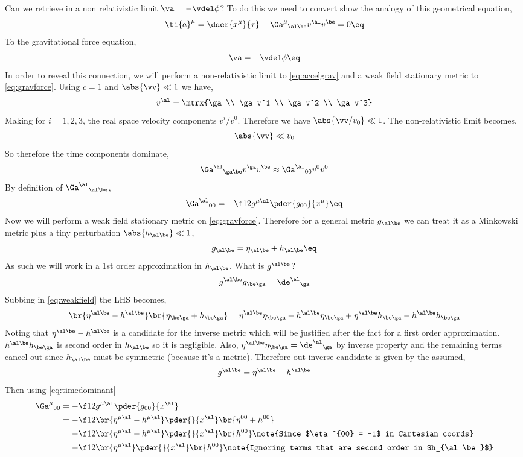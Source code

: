 \documentclass{article}
\begin{document}
Can we retrieve in a non relativistic limit $\va = - \vdel \phi$? To do this we need to convert show the analogy of this geometrical equation,
\[ \ti{a}^\mu = \dder{x^\mu}{\tau} + {\Ga^{\mu}}_{\al\be} v^\al v^\be = 0 \eq \label{eq:accelgrav} \]
To the gravitational force equation,
\[ \va = - \vdel \phi \eq \label{eq:gravforce}\]
In order to reveal this connection, we will perform a non-relativistic limit to \eqref{eq:accelgrav} and a weak field stationary metric to \eqref{eq:gravforce}. Using $c=1$ and $\abs{\vv} \ll 1$ we have,
\[ v^\al = \mtrx{\ga \\ \ga v^1 \\ \ga v^2 \\ \ga v^3} \]
Making for $i = 1,2,3$, the real space velocity components $v^i/v^0$. Therefore we have $\abs{\vv/v_0} \ll 1$. The non-relativistic limit becomes,
\[ \abs{\vv} \ll v_0 \]
So therefore the time components dominate,
\[ {\Ga^\al}_{\ga\be}v^\ga v^\be \approx {\Ga^\al}_{00}v^0 v^0 \]
By definition of ${\Ga^\al}_{\al\be}$,
\[ {\Ga^\al}_{00} = -\f12 g^{\mu\al} \pder{g_{00}}{x^\mu}  \eq \label{eq:timedominant}\]
Now we will perform a weak field stationary metric on \eqref{eq:gravforce}. Therefore for a general metric $g_{\al\be}$ we can treat it as a Minkowski metric plus a tiny perturbation $\abs{h_{\al\be}} \ll 1$,
\[ g_{\al\be} = \eta_{\al\be} + h_{\al\be} \eq \label{eq:weakfield} \]
As such we will work in a 1st order approximation in $h_{\al\be}$. What is $g^{\al\be}$?
\[ g^{\al\be}g_{\be\ga} = {\de^{\al}}_\ga \]
Subbing in \eqref{eq:weakfield} the LHS becomes,
\[ \br{\eta^{\al\be} - h^{\al\be}}\br{\eta_{\be\ga} + h_{\be\ga}} = \eta^{\al\be}\eta_{\be\ga} - h^{\al\be}\eta_{\be\ga} + \eta^{\al\be}h_{\be\ga} - h^{\al\be}h_{\be\ga} \]
Noting that $\eta^{\al\be} - h^{\al\be}$ is a candidate for the inverse metric which will be justified after the fact for a first order approximation. $h^{\al\be}h_{\be\ga}$ is second order in $h_{\al\be}$ so it is negligible. Also, $\eta^{\al\be}\eta_{\be\ga} = {\de^\al}_\ga$ by inverse property and the remaining terms cancel out since $h_{\al\be}$ must be symmetric (because it's a metric). Therefore out inverse candidate is given by the assumed,
\[ g^{\al\be} = \eta^{\al\be} - h^{\al\be} \]
Then using \eqref{eq:timedominant}
\begin{align*}
{\Ga^\mu}_{00} &= -\f12 g^{\mu\al} \pder{g_{00}}{x^\al}\\
&= -\f12 \br{\eta^{\mu\al} - h^{\mu\al}} \pder{}{x^\al}\br{\eta^{00} + h^{00}}\\
&= -\f12 \br{\eta^{\mu\al} - h^{\mu\al}} \pder{}{x^\al}\br{h^{00}} \note{Since $\eta^{00} = -1$ in Cartesian coords}\\
&= -\f12 \br{\eta^{\mu\al}} \pder{}{x^\al}\br{h^{00}} \note{Ignoring terms that are second order in $h_{\al\be}$}\\
\end{align*}
\end{document}

